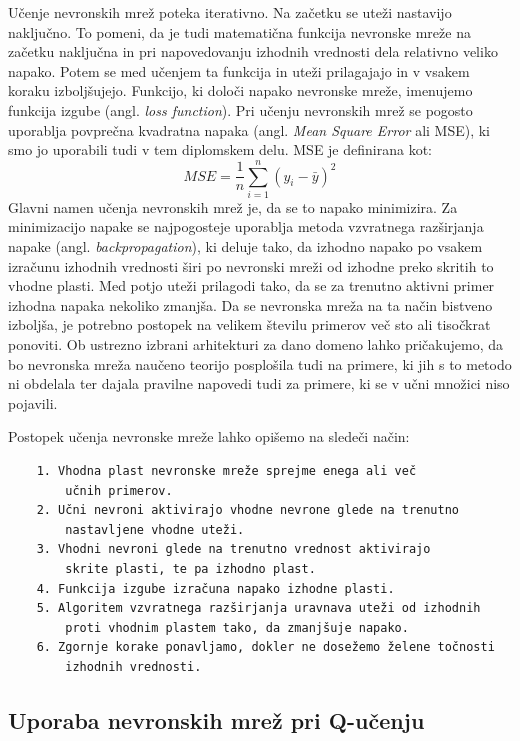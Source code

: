 \documentclass[cover]{thesis}
\begin{document}
Učenje nevronskih mrež poteka iterativno. Na začetku se uteži nastavijo naključno. To pomeni, da je tudi matematična funkcija nevronske mreže na začetku naključna in pri napovedovanju izhodnih vrednosti dela relativno veliko napako. Potem se med učenjem ta funkcija in uteži prilagajajo in v vsakem koraku izboljšujejo. Funkcijo, ki določi napako nevronske mreže, imenujemo funkcija izgube (angl. \emph{loss function}). Pri učenju nevronskih mrež se pogosto uporablja povprečna kvadratna napaka (angl. \emph{Mean Square Error} ali MSE), ki smo jo uporabili tudi v tem diplomskem delu. MSE je definirana kot:
\begin{equation}\label{eq:MSE}
    MSE = \frac{1}{n} \sum_{i=1}^{n} (y_i - \bar{y})^2
\end{equation}
Glavni namen učenja nevronskih mrež je, da se to napako minimizira. Za minimizacijo napake se najpogosteje uporablja metoda vzvratnega razširjanja napake (angl. \emph{backpropagation}), ki deluje tako, da izhodno napako po vsakem izračunu izhodnih vrednosti širi po nevronski mreži od izhodne preko skritih to vhodne plasti. Med potjo uteži prilagodi tako, da se za trenutno aktivni primer izhodna napaka nekoliko zmanjša. Da se nevronska mreža na ta način bistveno izboljša, je potrebno postopek na velikem številu primerov več sto ali tisočkrat ponoviti. Ob ustrezno izbrani arhitekturi za dano domeno lahko pričakujemo, da bo nevronska mreža naučeno teorijo posplošila tudi na primere, ki jih s to metodo ni obdelala ter dajala pravilne napovedi tudi za primere, ki se v učni množici niso pojavili.

Postopek učenja nevronske mreže lahko opišemo na sledeči način:

\begin{verbatim}        
    1. Vhodna plast nevronske mreže sprejme enega ali več
        učnih primerov.
    2. Učni nevroni aktivirajo vhodne nevrone glede na trenutno
        nastavljene vhodne uteži.
    3. Vhodni nevroni glede na trenutno vrednost aktivirajo
        skrite plasti, te pa izhodno plast.
    4. Funkcija izgube izračuna napako izhodne plasti.
    5. Algoritem vzvratnega razširjanja uravnava uteži od izhodnih
        proti vhodnim plastem tako, da zmanjšuje napako.
    6. Zgornje korake ponavljamo, dokler ne dosežemo želene točnosti
        izhodnih vrednosti.        
\end{verbatim}

\subsection{Uporaba nevronskih mrež pri Q-učenju}
\end{document}
